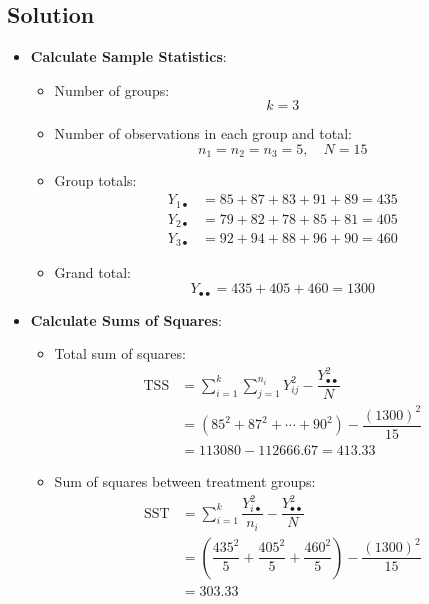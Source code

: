 \documentclass[twoside]{book}
\begin{document}
\subsection{Solution}
\begin{itemize}
\item \textbf{Calculate Sample Statistics}:

\begin{itemize}
\item Number of groups:
$$k = 3$$
\item Number of observations in each group and total:
\begin{equation*}
n_1 =  n_2= n_3 = 5, \quad N = 15
\end{equation*}

\item Group totals:
\begin{align*}
{Y}_{1\bullet} &= 85 + 87 + 83 + 91 + 89 = 435 \\
{Y}_{2\bullet} &= 79 + 82 + 78 + 85 + 81 = 405 \\
{Y}_{3\bullet} &= 92 + 94 + 88 + 96 + 90 = 460
\end{align*}

\item Grand total:
\begin{equation*}
{Y}_{\bullet\bullet} = 435 + 405 + 460 = 1300
\end{equation*}
\end{itemize}

\item \textbf{Calculate Sums of Squares}:

\begin{itemize}
\item Total sum of squares:
\begin{align*}
\text{TSS} &= \sum_{i=1}^k \sum_{j=1}^{n_i} Y_{ij}^2 - \dfrac{{Y}_{\bullet\bullet}^2}{N}\\
&= (85^2 + 87^2 + \cdots + 90^2) - \dfrac{(1300)^2}{15} \\
&= 113080 - 112666.67 = 413.33
\end{align*}

\item Sum of squares between treatment groups:
\begin{align*}
\text{SST} &=\sum_{i=1}^k \dfrac{Y_{i\bullet}^2}{n_i} - \dfrac{Y_{\bullet\bullet}^2}{N}\\
&= \left( \dfrac{435^2}{5}+\dfrac{405^2}{5}+\dfrac{460^2}{5}\right) -\dfrac{(1300)^2}{15}\\
&= 303.33
\end{align*}


\end{itemize}
\end{itemize}
\end{document}
